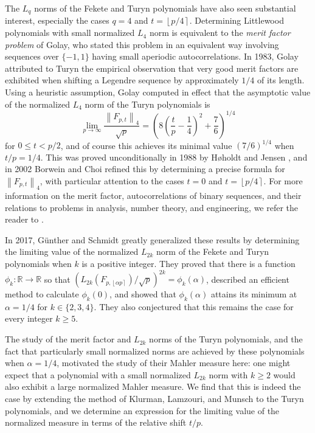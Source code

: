 \documentclass[reqno]{amsart}
\numberwithin{equation}{section}
\numberwithin{table}{section}
\numberwithin{figure}{section}
\newcommand{\dbars}[1]{\left\lVert#1\right\rVert}
\newcommand{\round}[1]{\left\lfloor#1\right\rceil}
\begin{document}
The $L_q$ norms of the Fekete and Turyn polynomials have also seen substantial interest, especially the cases $q=4$ and $t = \round{p/4}$.
Determining Littlewood polynomials with small normalized $L_4$ norm is equivalent to the \textit{merit factor problem} of Golay, who stated this problem in an equivalent way involving sequences over $\{-1,1\}$ having small aperiodic autocorrelations.
In 1983, Golay \cite{Golay83} attributed to Turyn the empirical observation that very good merit factors are exhibited when shifting a Legendre sequence by approximately $1/4$ of its length.
Using a heuristic assumption, Golay computed in effect that the asymptotic value of the normalized $L_4$ norm of the Turyn polynomials is
\[
\lim_{p\to\infty} \frac{\dbars{F_{p,t}}_4}{\sqrt{p}} = \left(8\left(\frac{t}{p}-\frac{1}{4}\right)^2+\frac{7}{6}\right)^{1/4}
\]
for $0\leq t< p/2$, and of course this achieves its minimal value $(7/6)^{1/4}$ when $t/p=1/4$.
This was proved unconditionally in 1988 by H{\o}holdt and Jensen \cite{HJ88}, and in 2002 Borwein and Choi \cite{BC02} refined this by determining a precise formula for $\dbars{F_{p,t}}_4$, with particular attention to the cases $t=0$ and $t=\round{p/4}$.
For more information on the merit factor, autocorrelations of binary sequences, and their relations to problems in analysis, number theory, and engineering, we refer the reader to .

In 2017, G\"unther and Schmidt \cite{GS17} greatly generalized these results by determining the limiting value of the normalized $L_{2k}$ norm of the Fekete and Turyn polynomials when $k$ is a positive integer.
They proved that there is a function $\phi_k : \mathbb{R}\to\mathbb{R}$ so that $(L_{2k}(F_{p,\round{\alpha p}})/\sqrt{p})^{2k} = \phi_k(\alpha)$, described an efficient method to calculate $\phi_k(0)$, and showed that $\phi_k(\alpha)$ attains its minimum at $\alpha=1/4$ for $k\in\{2,3,4\}$.
They also conjectured that this remains the case for every integer $k\geq5$.

The study of the merit factor and $L_{2k}$ norms of the Turyn polynomials, and the fact that particularly small normalized norms are achieved by these polynomials when $\alpha=1/4$, motivated the study of their Mahler measure here: one might expect that a polynomial with a small normalized $L_{2k}$ norm with $k\geq2$ would also exhibit a large normalized Mahler measure.
We find that this is indeed the case by extending the method of Klurman, Lamzouri, and Munsch to the Turyn polynomials, and we determine an expression for the limiting value of the normalized measure in terms of the relative shift $t/p$.
\end{document}
